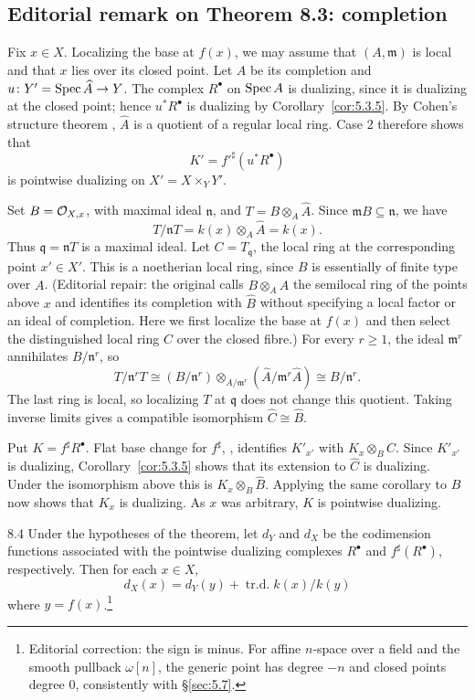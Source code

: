 \subsection*{Editorial remark on Theorem 8.3: completion}
Fix $x\in X$. Localizing the base at $f(x)$, we may assume that $(A,\mathfrak m)$ is local and that $x$ lies over its closed point. Let $\widehat A$ be its completion and $u\colon Y'=\operatorname{Spec}\widehat A\to Y$. The complex $R^\bullet$ on $\operatorname{Spec} A$ is dualizing, since it is dualizing at the closed point; hence $u^*R^\bullet$ is dualizing by Corollary~\ref{cor:5.3.5}. By Cohen's structure theorem \cite[\nopp (31.1)]{14}, $\widehat A$ is a quotient of a regular local ring. Case 2 therefore shows that
\[
K'=f'^{\sharp}(u^*R^\bullet)
\]
is pointwise dualizing on $X'=X\times_Y Y'$.\par
Set $B=\mathcal{O}_{X,x}$, with maximal ideal $\mathfrak n$, and $T=B\otimes_A\widehat A$. Since $\mathfrak mB\subseteq\mathfrak n$, we have
\[
T/\mathfrak nT
 = k(x)\otimes_A\widehat A = k(x).
\]
Thus $\mathfrak q=\mathfrak nT$ is a maximal ideal. Let $C=T_{\mathfrak q}$, the local ring at the corresponding point $x'\in X'$. This is a noetherian local ring, since $B$ is essentially of finite type over $A$. (Editorial repair: the original calls $B\otimes_A\widehat A$ the semilocal ring of the points above $x$ and identifies its completion with $\widehat B$ without specifying a local factor or an ideal of completion. Here we first localize the base at $f(x)$ and then select the distinguished local ring $C$ over the closed fibre.)
For every $r\geq1$, the ideal $\mathfrak m^r$ annihilates $B/\mathfrak n^r$, so
\[
T/\mathfrak n^rT
 \cong (B/\mathfrak n^r)\otimes_{A/\mathfrak m^r}
                (\widehat A/\mathfrak m^r\widehat A)
 \cong B/\mathfrak n^r.
\]
The last ring is local, so localizing $T$ at $\mathfrak q$ does not change this quotient. Taking inverse limits gives a compatible isomorphism $\widehat C\cong\widehat B$.\par
Put $K=f^{\sharp}R^\bullet$. Flat base change for $f^\sharp$, , identifies $K'_{x'}$ with $K_x\otimes_B C$. Since $K'_{x'}$ is dualizing, Corollary~\ref{cor:5.3.5} shows that its extension to $\widehat C$ is dualizing. Under the isomorphism above this is $K_x\otimes_B\widehat B$. Applying the same corollary to $B$ now shows that $K_x$ is dualizing. As $x$ was arbitrary, $K$ is pointwise dualizing.


\begin{bookcorollary}{8.4}\label{cor:5.8.4}
Under the hypotheses of the theorem, let $d_{Y}$ and $d_{X}$ be the codimension functions associated with the pointwise dualizing complexes $R^{\bullet}$ and $f^{\sharp}(R^{\bullet})$, respectively. Then for each $x\in X$,
\[
d_{X}(x) = d_{Y}(y) + \operatorname{tr.d.} k(x)/k(y)
\]
where $y=f(x)$.\footnote{Editorial correction: the sign is minus. For affine $n$-space over a field and the smooth pullback $\omega[n]$, the generic point has degree $-n$ and closed points degree $0$, consistently with \S\ref{sec:5.7}.}
\end{bookcorollary}

